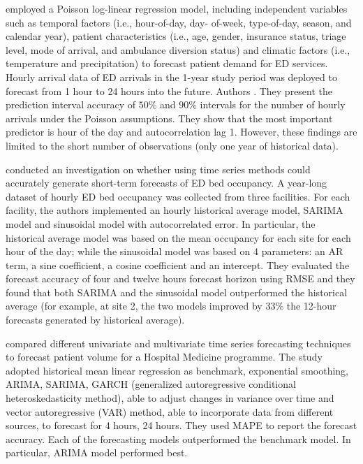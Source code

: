 \documentclass[]{elsarticle} %
\begin{document}
\citet{mccarthy2008challenge} employed a Poisson log-linear regression model, including independent variables such as temporal factors (i.e., hour-of-day, day- of-week, type-of-day, season, and calendar year), patient characteristics (i.e., age, gender, insurance status, triage level, mode of arrival, and ambulance diversion status) and climatic factors (i.e., temperature and precipitation) to forecast patient demand for ED services. Hourly arrival data of ED arrivals in the 1-year study period was deployed to forecast from 1 hour to 24 hours into the future. Authors . They present the prediction interval accuracy of \(50\%\) and \(90\%\) intervals for the number of hourly arrivals under the Poisson assumptions. They show that the most important predictor is hour of the day and autocorrelation lag 1. However, these findings are limited to the short number of observations (only one year of historical data).

\citet{schweigler2009forecasting} conducted an investigation on whether using time series methods could accurately generate short-term forecasts of ED bed occupancy. A year-long dataset of hourly ED bed occupancy was collected from three facilities. For each facility, the authors implemented an hourly historical average model, SARIMA model and sinusoidal model with autocorrelated error. In particular, the historical average model was based on the mean occupancy for each site for each hour of the day; while the sinusoidal model was based on 4 parameters: an AR term, a sine coefficient, a cosine coefficient and an intercept. They evaluated the forecast accuracy of four and twelve hours forecast horizon using RMSE and they found that both SARIMA and the sinusoidal model outperformed the historical average (for example, at site 2, the two models improved by \(33\%\) the 12-hour forecasts generated by historical average).

\citet{kim2014predicting} compared different univariate and multivariate time series forecasting techniques to forecast patient volume for a Hospital Medicine programme. The study adopted historical mean linear regression as benchmark, exponential smoothing, ARIMA, SARIMA, GARCH (generalized autoregressive conditional heteroskedasticity method), able to adjust changes in variance over time and vector autoregressive (VAR) method, able to incorporate data from different sources, to forecast for 4 hours, 24 hours. They used MAPE to report the forecast accuracy.
Each of the forecasting models outperformed the benchmark model. In particular, ARIMA model performed best.
\end{document}
